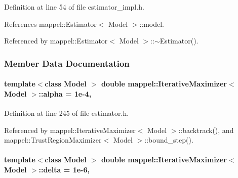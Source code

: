 Definition at line 54 of file estimator\+\_\+impl.\+h.



References mappel\+::\+Estimator$<$ Model $>$\+::model.



Referenced by mappel\+::\+Estimator$<$ Model $>$\+::$\sim$\+Estimator().



\subsubsection{Member Data Documentation}
\paragraph[{\texorpdfstring{alpha}{alpha}}]{\setlength{\rightskip}{0pt plus 5cm}template$<$class Model $>$ double {\bf mappel\+::\+Iterative\+Maximizer}$<$ Model $>$\+::alpha = 1e-\/4\hspace{0.3cm}{\ttfamily [protected]}, {\ttfamily [inherited]}}\hypertarget{classmappel_1_1IterativeMaximizer_ae8a6d8e5c263fa60aaf39fbf96cd6c48}{}\label{classmappel_1_1IterativeMaximizer_ae8a6d8e5c263fa60aaf39fbf96cd6c48}


Definition at line 245 of file estimator.\+h.



Referenced by mappel\+::\+Iterative\+Maximizer$<$ Model $>$\+::backtrack(), and mappel\+::\+Trust\+Region\+Maximizer$<$ Model $>$\+::bound\+\_\+step().

\paragraph[{\texorpdfstring{delta}{delta}}]{\setlength{\rightskip}{0pt plus 5cm}template$<$class Model $>$ double {\bf mappel\+::\+Iterative\+Maximizer}$<$ Model $>$\+::delta = 1e-\/6\hspace{0.3cm}{\ttfamily [protected]}, {\ttfamily [inherited]}}\hypertarget{classmappel_1_1IterativeMaximizer_a0aab5231009711a55325adbeb7d5f282}{}\label{classmappel_1_1IterativeMaximizer_a0aab5231009711a55325adbeb7d5f282}


